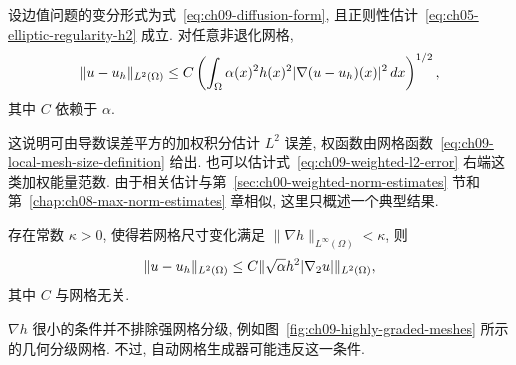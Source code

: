 \begin{Theorem}
\label{thm:ch09-weighted-l2-error}
设边值问题的变分形式为式~\eqref{eq:ch09-diffusion-form}, 且正则性估计~\eqref{eq:ch05-elliptic-regularity-h2} 成立. 对任意非退化网格,
\begin{equation}
\MathBookFormulaID{formula-ch09-weighted-l2-error}
\label{eq:ch09-weighted-l2-error}
\|u-u_h\|_{L^2(\Omega)}
\leq C\left(\int_\Omega\alpha(x)^2h(x)^2|\nabla(u-u_h)(x)|^2\,dx\right)^{1/2},
\end{equation}
其中 $C$ 依赖于 $\alpha$.
\end{Theorem}

这说明可由导数误差平方的加权积分估计 $L^2$ 误差, 权函数由网格函数~\eqref{eq:ch09-local-mesh-size-definition} 给出. 也可以估计式~\eqref{eq:ch09-weighted-l2-error} 右端这类加权能量范数. 由于相关估计与第~\ref{sec:ch00-weighted-norm-estimates} 节和第~\ref{chap:ch08-max-norm-estimates} 章相似, 这里只概述一个典型结果.

\begin{Theorem}
\label{thm:ch09-mesh-gradient-l2-error}
存在常数 $\kappa>0$, 使得若网格尺寸变化满足 $\|\nabla h\|_{L^\infty(\Omega)}<\kappa$, 则
\[
\MathBookFormulaID{formula-ch09-mesh-gradient-l2-error}
\|u-u_h\|_{L^2(\Omega)}\leq C\|\sqrt\alpha h^2|\nabla_2u|\|_{L^2(\Omega)},
\]
其中 $C$ 与网格无关.
\end{Theorem}

$\nabla h$ 很小的条件并不排除强网格分级, 例如图~\ref{fig:ch09-highly-graded-meshes} 所示的几何分级网格. 不过, 自动网格生成器可能违反这一条件.
